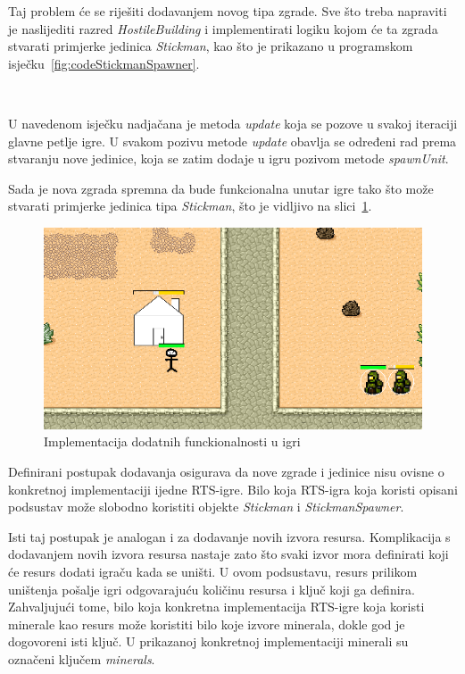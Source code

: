 \documentclass[times, utf8, zavrsni, numeric]{fer}
\begin{document}
\par Taj problem će se riješiti dodavanjem novog tipa zgrade.
Sve što treba napraviti je naslijediti razred \textit{HostileBuilding} i implementirati logiku kojom će ta zgrada stvarati primjerke jedinica \textit{Stickman}, kao što je prikazano u programskom isječku~\ref{fig:codeStickmanSpawner}.

\vspace{3mm}
\begin{minipage}{\textwidth}
	
\end{minipage}\

\par U navedenom isječku nadjačana je metoda \textit{update} koja se pozove u svakoj iteraciji glavne petlje igre.
U svakom pozivu metode \textit{update} obavlja se određeni rad prema stvaranju nove jedinice, koja se zatim dodaje u igru pozivom metode \textit{spawnUnit}.

\par Sada je nova zgrada spremna da bude funkcionalna unutar igre tako što može stvarati primjerke jedinica tipa \textit{Stickman}, što je vidljivo na slici~\ref{fig:stickman}.

\begin{figure}[h]
	\centering
	\includegraphics[width=0.7\linewidth]{images/stickman.png}
	\caption{Implementacija dodatnih funckionalnosti u igri}
	\label{fig:stickman}
\end{figure}

\par Definirani postupak dodavanja osigurava da nove zgrade i jedinice nisu ovisne o konkretnoj implementaciji ijedne RTS-igre.
Bilo koja RTS-igra koja koristi opisani podsustav može slobodno koristiti objekte \textit{Stickman} i \textit{StickmanSpawner}.

\par Isti taj postupak je analogan i za dodavanje novih izvora resursa.
Komplikacija s dodavanjem novih izvora resursa nastaje zato što svaki izvor mora definirati koji će resurs dodati igraču kada se uništi.
U ovom podsustavu, resurs prilikom uništenja pošalje igri odgovarajuću količinu resursa i ključ koji ga definira.
Zahvaljujući tome, bilo koja konkretna implementacija RTS-igre koja koristi minerale kao resurs može koristiti bilo koje izvore minerala, dokle god je dogovoreni isti ključ.
U prikazanoj konkretnoj implementaciji minerali su označeni ključem \textit{minerals}.
\end{document}
